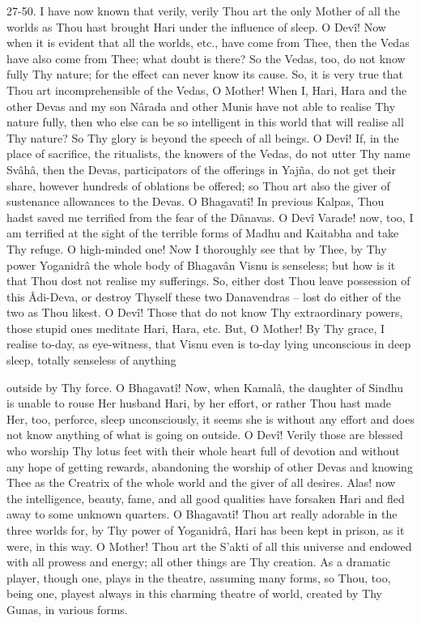27-50. I have now known that verily, verily Thou art the only Mother of all the worlds as Thou hast brought Hari under the influence of sleep. O Devî! Now when it is evident that all the worlds, etc., have come from Thee, then the Vedas have also come from Thee; what doubt is there? So the Vedas, too, do not know fully Thy nature; for the effect can never know its cause. So, it is very true that Thou art incomprehensible of the Vedas, O Mother! When I, Hari, Hara and the other Devas and my son Nârada and other Munis have not able to realise Thy nature fully, then who else can be so intelligent in this world that will realise all Thy nature? So Thy glory is beyond the speech of all beings. O Devî! If, in the place of sacrifice, the ritualists, the knowers of the Vedas, do not utter Thy name Svâhâ, then the Devas, participators of the offerings in Yajña, do not get their share, however hundreds of oblations be offered; so Thou art also the giver of sustenance allowances to the Devas. O Bhagavatî! In previous Kalpas, Thou hadst saved me terrified from the fear of the Dânavas. O Devî Varade! now, too, I am terrified at the sight of the terrible forms of Madhu and Kaitabha and take Thy refuge. O high-minded one! Now I thoroughly see that by Thee, by Thy power Yoganidrâ the whole body of Bhagavân Visnu is senseless; but how is it that Thou dost not realise my sufferings. So, either dost Thou leave possession of this Âdi-Deva, or destroy Thyself these two Danavendras -- lost do either of the two as Thou likest. O Devî! Those that do not know Thy extraordinary powers, those stupid ones meditate Hari, Hara, etc. But, O Mother! By Thy grace, I realise to-day, as eye-witness, that Visnu even is to-day lying unconscious in deep sleep, totally senseless of anything

 

 

outside by Thy force. O Bhagavatî! Now, when Kamalâ, the daughter of Sindhu is unable to rouse Her husband Hari, by her effort, or rather Thou hast made Her, too, perforce, sleep unconsciously, it seems she is without any effort and does not know anything of what is going on outside. O Devî! Verily those are blessed who worship Thy lotus feet with their whole heart full of devotion and without any hope of getting rewards, abandoning the worship of other Devas and knowing Thee as the Creatrix of the whole world and the giver of all desires. Alas! now the intelligence, beauty, fame, and all good qualities have forsaken Hari and fled away to some unknown quarters. O Bhagavatî! Thou art really adorable in the three worlds for, by Thy power of Yoganidrâ, Hari has been kept in prison, as it were, in this way. O Mother! Thou art the S’akti of all this universe and endowed with all prowess and energy; all other things are Thy creation. As a dramatic player, though one, plays in the theatre, assuming many forms, so Thou, too, being one, playest always in this charming theatre of world, created by Thy Gunas, in various forms.

